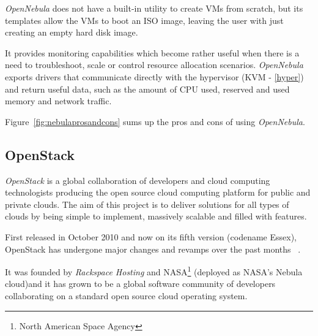 
\textit{OpenNebula} does not have a built-in utility to create VMs from scratch, but its templates allow the VMs to boot an ISO image, leaving the user with just creating an empty hard disk image.

It provides monitoring capabilities which become rather useful when there is a need to troubleshoot, scale or control resource allocation scenarios. \textit{OpenNebula} exports drivers that communicate directly with the hypervisor (KVM - \ref{hyper}) and return useful data, such as the amount of CPU used, reserved and used memory and network traffic.\cite{open-clouds}

Figure~\ref{fig:nebulaprosandcons} sums up the pros and cons of using \textit{OpenNebula}.


\subsection{OpenStack}\label{openstack}

\textit{OpenStack} is a global collaboration of developers and cloud computing technologists producing the open source cloud computing platform for public and private clouds. The aim of this project is to deliver solutions for all types of clouds by being simple to implement, massively scalable and filled with features. 

First released in October 2010 and now on its fifth version (codename Essex), OpenStack has undergone major changes and revamps over the past months ~\cite{openstack}.

It was founded by \textit{Rackspace Hosting} and NASA\footnote{North American Space Agency} (deployed as NASA's Nebula cloud\cite{needs cite})and it has grown to be a global software community of developers collaborating on a standard open source cloud operating system.

